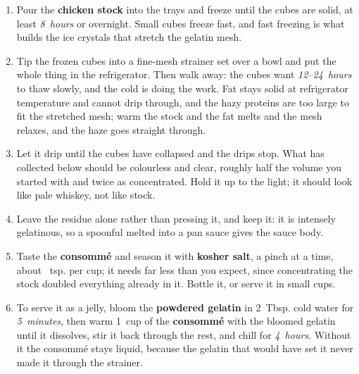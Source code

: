 \documentclass[11pt,letterpaper]{article}
\begin{document}
\begin{enumerate}
    \item Pour the \textbf{chicken stock} into the trays and freeze until the cubes are solid, at least \textit{8~hours} or overnight. Small cubes freeze fast, and fast freezing is what builds the ice crystals that stretch the gelatin mesh.

    \item Tip the frozen cubes into a fine-mesh strainer set over a bowl and put the whole thing in the refrigerator. Then walk away: the cubes want \textit{12--24~hours} to thaw slowly, and the cold is doing the work. Fat stays solid at refrigerator temperature and cannot drip through, and the hazy proteins are too large to fit the stretched mesh; warm the stock and the fat melts and the mesh relaxes, and the haze goes straight through.

    \item Let it drip until the cubes have collapsed and the drips stop. What has collected below should be colourless and clear, roughly half the volume you started with and twice as concentrated. Hold it up to the light; it should look like pale whiskey, not like stock.

    \item Leave the residue alone rather than pressing it, and keep it: it is intensely gelatinous, so a spoonful melted into a pan sauce gives the sauce body.

    \item Taste the \textbf{consomm\'e} and season it with \textbf{kosher salt}, a pinch at a time, about ~tsp. per cup; it needs far less than you expect, since concentrating the stock doubled everything already in it. Bottle it, or serve it in small cups.

    \item To serve it as a jelly, bloom the \textbf{powdered gelatin} in 2~Tbsp. cold water for \textit{5~minutes}, then warm 1~cup of the \textbf{consomm\'e} with the bloomed gelatin until it dissolves, stir it back through the rest, and chill for \textit{4~hours}. Without it the consomm\'e stays liquid, because the gelatin that would have set it never made it through the strainer.
\end{enumerate}

\newpage
\end{document}
